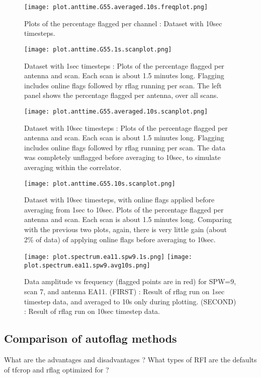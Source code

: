 \begin{figure}
\texttt{[image: plot.anttime.G55.averaged.10s.freqplot.png]}
\caption{Plots of the percentage flagged per channel : Dataset with 10sec timesteps.}
\label{Fig:compare_2}
\end{figure}

\begin{figure}
\texttt{[image: plot.anttime.G55.1s.scanplot.png]}
\caption{Dataset with 1sec timesteps : Plots of the percentage flagged per antenna and scan. Each scan is about 1.5 minutes long. Flagging includes online flags followed by rflag running per scan. The left panel shows the percentage flagged per antenna, over all scans.}
\label{Fig:compare_3}
\end{figure}

\begin{figure}
\texttt{[image: plot.anttime.G55.averaged.10s.scanplot.png]}
\caption{Dataset with 10sec timesteps : Plots of the percentage flagged per antenna and scan. Each scan is about 1.5 minutes long. Flagging includes online flags followed by rflag running per scan. The data was completely unflagged before averaging to 10sec, to simulate averaging within the correlator.}
\label{Fig:compare_4}
\end{figure}

\begin{figure}
\texttt{[image: plot.anttime.G55.10s.scanplot.png]}
\caption{Dataset with 10sec timesteps, with online flags applied before averaging from 1sec to 10sec.  Plots of the percentage flagged per antenna and scan. Each scan is about 1.5 minutes long. Comparing with the previous two plots, again, there is very little gain (about 2\% of data) of applying online flags before averaging to 10sec. }
\label{Fig:compare_5}
\end{figure}


\begin{figure}
\texttt{[image: plot.spectrum.ea11.spw9.1s.png]}
\texttt{[image: plot.spectrum.ea11.spw9.avg10s.png]}
\caption{Data amplitude vs frequency (flagged points are in red) for SPW=9, scan 7, and antenna EA11.  (FIRST) : Result of rflag run on 1sec timestep data, and averaged to 10s only during plotting.  (SECOND) : Result of rflag run on 10sec timestep data.}
\label{Fig:compare_6}
\end{figure}



\subsection{Comparison of autoflag methods}
What are the advantages and disadvantages ?  What types of RFI are the defaults of tfcrop and rflag optimized for ?  

